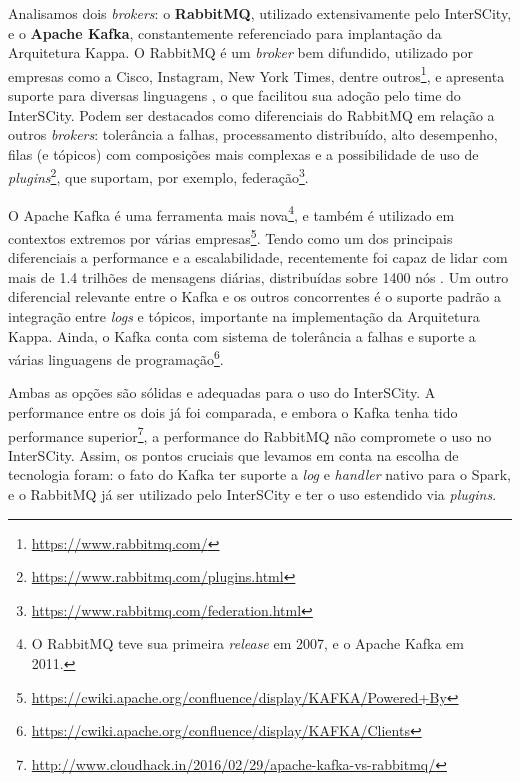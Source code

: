 Analisamos dois \textit{brokers}: o \textbf{RabbitMQ}, utilizado
extensivamente pelo InterSCity, e o \textbf{Apache Kafka}, constantemente
referenciado para implantação da Arquitetura Kappa. O RabbitMQ é um
\textit{broker} bem difundido, utilizado por empresas como a Cisco, Instagram,
New York Times, dentre outros\footnote{\url{https://www.rabbitmq.com/}},
e apresenta suporte para diversas linguagens \cite{zaitsev2014}, o que
facilitou sua adoção pelo time do InterSCity. Podem ser destacados como
diferenciais do RabbitMQ em relação a outros \textit{brokers}: tolerância a
falhas, processamento distribuído, alto desempenho, filas (e tópicos) com
composições mais complexas e a possibilidade de uso de
\textit{plugins}\footnote{\url{https://www.rabbitmq.com/plugins.html}},
que suportam, por exemplo,
federação\footnote{\url{https://www.rabbitmq.com/federation.html}}.

O Apache Kafka é uma ferramenta mais nova\footnote{O RabbitMQ teve
sua primeira \textit{release} em 2007, e o Apache Kafka em 2011.}, e também é
utilizado em contextos extremos por várias
empresas\footnote{\url{https://cwiki.apache.org/confluence/display/KAFKA/Powered+By}}.
Tendo como um dos principais diferenciais a performance e a escalabilidade,
recentemente foi capaz de lidar com mais de 1.4 trilhões de mensagens diárias,
distribuídas sobre 1400 nós \cite{koshy2016}. Um outro diferencial relevante
entre o Kafka e os outros concorrentes é o suporte padrão a integração entre
\textit{logs} e tópicos, importante na implementação da Arquitetura Kappa. Ainda,
o Kafka conta com sistema de tolerância a falhas e suporte a várias linguagens de
programação\footnote{\url{https://cwiki.apache.org/confluence/display/KAFKA/Clients}}.

Ambas as opções são sólidas e adequadas para o uso do InterSCity. A
performance entre os dois já foi comparada, e embora o Kafka tenha tido
performance
superior\footnote{\url{http://www.cloudhack.in/2016/02/29/apache-kafka-vs-rabbitmq/}},
a performance do RabbitMQ não compromete o uso no InterSCity. Assim, os pontos
cruciais que levamos em conta na escolha de tecnologia foram: o fato do Kafka
ter suporte a \textit{log} e \textit{handler} nativo para o Spark, e o RabbitMQ
já ser utilizado pelo InterSCity e ter o uso estendido via \textit{plugins}.
